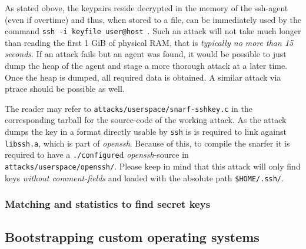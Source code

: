As stated obove, the keypairs reside decrypted in the memory of the ssh-agent
(even if overtime) and thus, when stored to a file, can be immediately used by
the command \texttt{ssh~-i~keyfile~user@host}~.  Such an attack will not take
much longer than reading the first 1 GiB of physical RAM, that is
\emph{typically no more than 15 seconds}. If an attack fails but an agent was
found, it would be possible to just dump the heap of the agent and stage a more
thorough attack at a later time.  Once the heap is dumped, all required data is
obtained.  A similar attack via ptrace should be possible as well.


The reader may refer to \texttt{attacks/userspace/snarf-sshkey.c} in the
corresponding tarball for the source-code of the working attack. As the attack
dumps the key in a format directly usable by \texttt{ssh} is is required to link
against \texttt{libssh.a}, which is part of \emph{openssh}. Because of this, to
compile the snarfer it is required to have a \texttt{./configure}d
\emph{openssh}-source in \texttt{attacks/userspace/openssh/}. Please keep in
mind that this attack will only find keys \emph{without comment-fields} and
loaded with the absolute path \texttt{\$HOME/.ssh/}.



\subsubsection{Matching and statistics to find secret keys}



\subsection{Bootstrapping custom operating systems}



